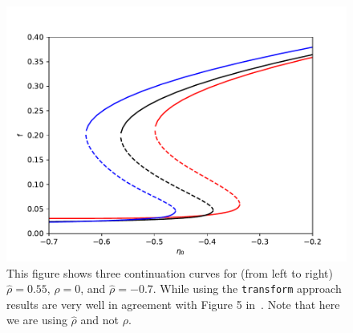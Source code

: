 \documentclass[bibliography=totoc, twoside]{article}
\numberwithin{equation}{section}
\begin{document}
\begin{figure}
    \centering
    \includegraphics[width=.8\linewidth]{eta_0_continuation.pdf}
    \caption{This figure shows three continuation curves for (from left to right) $\hat{\rho}=0.55$, $\hat{\rho}=0$, and $\hat{\rho}=-0.7$.
    While using the \texttt{transform} approach results are very well in agreement with Figure 5 in~\cite{Laing2019}.
    Note that here we are using $\hat{\rho}$ and not $\rho$.}
    \label{fig:thetanet:eta_0_continuation}
\end{figure}
\end{document}
